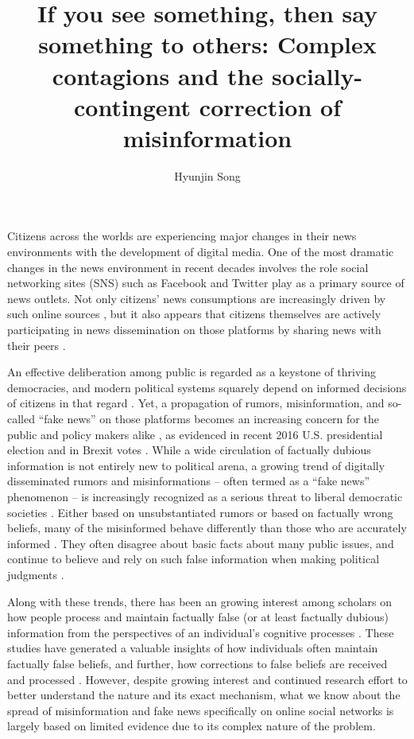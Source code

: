 \documentclass[man, 12pt, a4paper, nolmodern, noextraspace]{apa6}
\title{If you see something, then say something to others: Complex contagions and the socially-contingent correction of misinformation}
\author{\addvspace{.25in} Hyunjin Song}
\affiliation{Department of Communication, University of Vienna, Austria}
\begin{document}
\setcounter{page}{0}
\maketitle
  Citizens across the worlds are experiencing major changes in their news environments with the development of digital media. One of the most dramatic changes in the news environment in recent decades involves the role social networking sites (SNS) such as Facebook and Twitter play as a primary source of news outlets. Not only citizens' news consumptions are increasingly driven by such online sources \parencite{shearer2017news}, but it also appears that citizens themselves are actively participating in news dissemination on those platforms by sharing news with their peers \parencite[e.g.,][]{shearer2017news, lee2017people}. 

  An effective deliberation among public is regarded as a keystone of thriving democracies, and modern political systems squarely depend  on  informed  decisions of citizens in that regard \parencite{carpini1996}. Yet, a propagation of rumors, misinformation, and so-called \enquote{fake news} on those platforms becomes an increasing concern for the public and policy makers alike \parencite{allcott2017social, lazer2017combating}, as evidenced in recent 2016 U.S. presidential election \parencite{guess2018selective, giglietto2016fakes, allcott2017social} and in Brexit votes \parencite{nyt_2017}. While a wide circulation of factually dubious information is not entirely new to political arena, a growing trend of digitally disseminated rumors and misinformations -- often termed as a \enquote{fake news} phenomenon -- is increasingly recognized as a serious threat to liberal democratic societies \parencite{allcott2017social, lazer2017combating}. Either based on unsubstantiated rumors or based on factually wrong beliefs, many of the misinformed behave differently than those who are accurately informed \parencite{kuklinski2000misinformation}. They often disagree about basic facts about many public issues, and continue to believe and rely on such false information when making political judgments \parencite{nyhan2010corrections,thorson_2016}. 

  Along with these trends, there has been an growing interest among scholars on how people process and maintain factually false (or at least factually dubious) information from the perspectives of an individual's cognitive processes \parencite{Lewandowsky_2012PSPI, kuklinski2000misinformation, weeks2015emotions}. These studies have generated a valuable insights of how individuals often maintain factually false beliefs, and further, how corrections to false beliefs are received and processed \parencite{Lewandowsky_2012PSPI, thorson_2016, garrett2016driving}. However, despite growing interest and continued research effort to better understand the nature and its exact mechanism, what we know about the spread of misinformation and fake news specifically on online social networks is largely based on limited evidence due to its complex nature of the problem.
\end{document}
